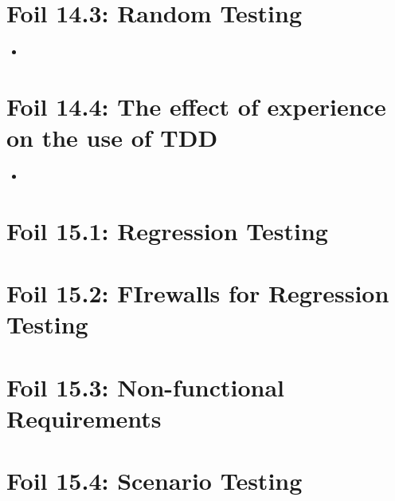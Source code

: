 	\section{Foil 14.3: Random Testing}
		\begin{itemize}
			\item 
		\end{itemize}

	\section{Foil 14.4: The effect of experience on the use of TDD}
		\begin{itemize}
			\item 
		\end{itemize}

	


	\section{Foil 15.1: Regression Testing}

	\section{Foil 15.2: FIrewalls for Regression Testing}

	\section{Foil 15.3: Non-functional Requirements}

	\section{Foil 15.4: Scenario Testing}